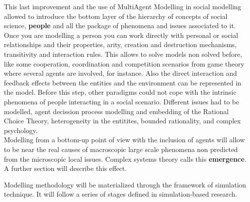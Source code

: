 \documentclass[11pt,oneside,a4paper,openright]{report}
\begin{document}
This last improvement and the use of MultiAgent Modelling in social modelling allowed to introduce the bottom layer of the hierarchy of concepts of social science, \textbf{people} and all the package of phenomena and issues associated to it. Once you are modelling a person you can work directly with personal or social relationships and their properties, arity, creation and destruction mechanisms, transitivity and interaction rules. This allows to solve models non solved before, like some cooperation, coordination and competition scenarios from game theory where several agents are involved, for instance. Also the direct interaction and feedback effects between the entities and the environment can be represented in the model. Before this step, other paradigms could not cope with the intrinsic phenomena of people interacting in a social scenario. Different issues had to be modelled, agent decission process modelling and embedding of the Rational Choice Theory, heterogeneity in the entitites, bounded rationality, and complex psychology.\\ 
Modelling from a bottom-up point of view with the inclusion of agents will allow to be near the real causes of macroscopic large scale phenomena non predicted from the microscopic local issues. Complex systems theory calls this \textbf{emergence}.
A further section will describe this effect.

 

Modelling methodology will be materialized through the framework of simulation technique. It will follow a series
of stages defined in simulation-based research. 
\end{document}
